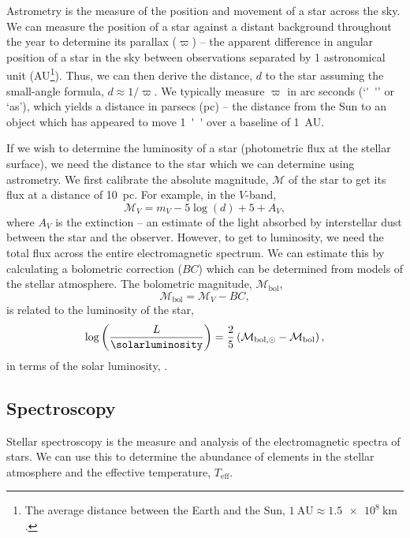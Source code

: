 Astrometry is the measure of the position and movement of a star across the sky. We can measure the position of a star against a distant background throughout the year to determine its parallax ($\varpi$) -- the apparent difference in angular position of a star in the sky between observations separated by 1 astronomical unit (AU\footnote{The average distance between the Earth and the Sun, $\SI{1}{\mathrm{AU}} \approx \SI{1.5e8}{\kilo\meter}$.}). Thus, we can then derive the distance, $d$ to the star assuming the small-angle formula, $d \approx 1/\varpi$. We typically measure $\varpi$ in arc seconds (`\si{''}' or `as'), which yields a distance in parsecs (pc) -- the distance from the Sun to an object which has appeared to move \SI{1}{''} over a baseline of \SI{1}{AU}.

If we wish to determine the luminosity of a star (photometric flux at the stellar surface), we need the distance to the star which we can determine using astrometry. We first calibrate the absolute magnitude, $\mathcal{M}$ of the star to get its flux at a distance of \SI{10}{pc}. For example, in the $V$-band,
\begin{equation}
    \mathcal{M}_V = m_V - 5 \log(d) + 5 + A_V,
\end{equation}
where $A_V$ is the extinction -- an estimate of the light absorbed by interstellar dust between the star and the observer. However, to get to luminosity, we need the total flux across the entire electromagnetic spectrum. We can estimate this by calculating a bolometric correction ($BC$) which can be determined from models of the stellar atmosphere. The bolometric magnitude, $\mathcal{M}_\mathrm{bol}$,
\begin{equation}
    \mathcal{M}_\mathrm{bol} = \mathcal{M}_V - BC,
\end{equation}
is related to the luminosity of the star,
\begin{equation}
    \log\left(\frac{L}{\si{\solarluminosity}}\right) = \frac{2}{5}\left(\mathcal{M}_{\mathrm{bol}, \odot}-\mathcal{M}_{\mathrm{bol}}\right),
\end{equation}
in terms of the solar luminosity, \si{\solarluminosity}.

\subsection{Spectroscopy}

Stellar spectroscopy is the measure and analysis of the electromagnetic spectra of stars. We can use this to determine the abundance of elements in the stellar atmosphere and the effective temperature, $T_\mathrm{eff}$.

